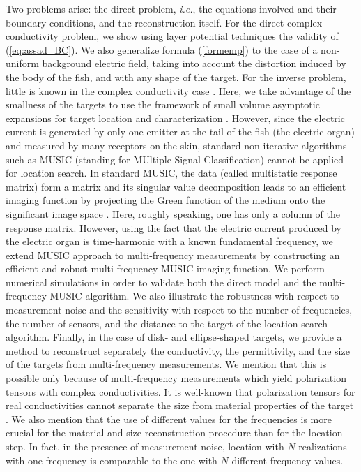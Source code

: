 \documentclass[final]{siamltex}
\numberwithin{equation}{section}
\numberwithin{figure}{section}
\numberwithin{table}{section}
\begin{document}
Two problems arise: the direct problem, \emph{i.e.}, the equations
involved and their boundary conditions, and the reconstruction
itself. For the direct complex conductivity problem, we show using
layer potential techniques the validity of (\ref{eq:assad_BC}). We
also generalize formula (\ref{formemp}) to the case of a
non-uniform background electric field, taking into account the
distortion induced by the body of the fish, and with any shape of
the target. For the inverse problem, little is known in the
complex conductivity case \cite{beretta}. Here, we take advantage
of the smallness of the targets to use the framework of small
volume asymptotic expansions for target location and
characterization \cite{ammari2004reconstruction,
ammari2007polarization}. However, since the electric current is
generated by only one emitter at the tail of the fish (the
electric organ) and measured by many receptors on the skin,
standard non-iterative algorithms such as MUSIC (standing for
MUltiple Signal Classification) cannot be applied for location
search. In standard MUSIC, the data (called multistatic response
matrix) form a matrix and its singular value decomposition leads
to an efficient imaging function by projecting the Green function
of the medium onto the significant image space
\cite{park,ail,ammarinumer, bruhl2003direct, chambers, cheney,
kirsch}. Here, roughly speaking, one has only a column of the
response matrix. However, using the fact that the electric current
produced by the electric organ is time-harmonic with a known
fundamental frequency, we extend MUSIC approach to multi-frequency
measurements by constructing an efficient and robust
multi-frequency MUSIC imaging function. We perform numerical
simulations in order to validate both the direct model and the
multi-frequency MUSIC algorithm. We also illustrate the robustness
with respect to measurement noise and the sensitivity with respect
to the number of frequencies, the number of sensors, and the
distance to the target of the location search algorithm. Finally,
in the case of disk- and ellipse-shaped targets, we provide a
method to reconstruct separately the conductivity, the
permittivity, and the size of the targets from multi-frequency
measurements. We mention that this is possible only because of
multi-frequency measurements which yield polarization tensors with
complex conductivities. It is well-known that polarization tensors
for real conductivities cannot separate the size from material
properties of the target \cite{ammari2007polarization}. We also
mention that the use of different values for the frequencies is
more crucial for the material and size reconstruction procedure
than for the location step. In fact, in the presence of
measurement noise, location with $N$ realizations with one
frequency is comparable to the one with $N$ different frequency
values.
\end{document}
